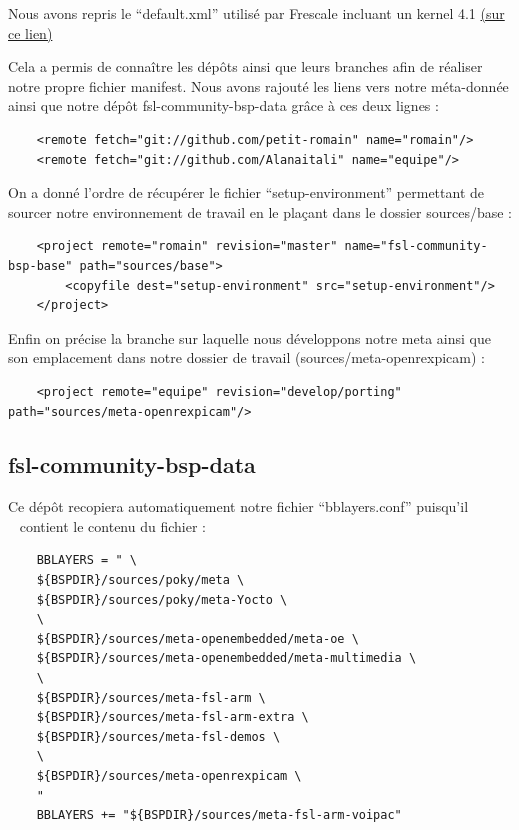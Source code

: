 Nous avons repris le “default.xml” utilisé par Frescale incluant un kernel 4.1
\href{http://git.freescale.com/git/cgit.cgi/imx/fsl-arm-yocto-bsp.git/tree/default.xml?h=imx-4.1-krogoth}
{(sur ce lien)}

Cela a permis de connaître les dépôts ainsi que leurs branches afin de réaliser notre
propre fichier manifest. Nous avons rajouté les liens vers notre méta-donnée ainsi que
notre dépôt fsl-community-bsp-data grâce à ces deux lignes : \medskip

\begin{lstlisting}
    <remote fetch="git://github.com/petit-romain" name="romain"/>
    <remote fetch="git://github.com/Alanaitali" name="equipe"/>    
\end{lstlisting}

On a donné l’ordre de récupérer le fichier “setup-environment” permettant de sourcer notre
environnement de travail en le plaçant dans le dossier sources/base : \medskip 

\begin{lstlisting}
    <project remote="romain" revision="master" name="fsl-community-bsp-base" path="sources/base">
        <copyfile dest="setup-environment" src="setup-environment"/>
    </project>
\end{lstlisting}

Enfin on précise la branche sur laquelle nous développons notre meta ainsi que son
emplacement dans notre dossier de travail (sources/meta-openrexpicam) :

\begin{lstlisting}
    <project remote="equipe" revision="develop/porting" path="sources/meta-openrexpicam"/>
\end{lstlisting}

\subsection{fsl-community-bsp-data}

Ce dépôt recopiera automatiquement notre fichier “bblayers.conf” puisqu’il \\ 
contient le contenu du fichier : 

\begin{lstlisting}
    BBLAYERS = " \
    ${BSPDIR}/sources/poky/meta \
    ${BSPDIR}/sources/poky/meta-Yocto \
    \
    ${BSPDIR}/sources/meta-openembedded/meta-oe \
    ${BSPDIR}/sources/meta-openembedded/meta-multimedia \
    \
    ${BSPDIR}/sources/meta-fsl-arm \
    ${BSPDIR}/sources/meta-fsl-arm-extra \
    ${BSPDIR}/sources/meta-fsl-demos \
    \
    ${BSPDIR}/sources/meta-openrexpicam \
    "
    BBLAYERS += "${BSPDIR}/sources/meta-fsl-arm-voipac"
\end{lstlisting}

